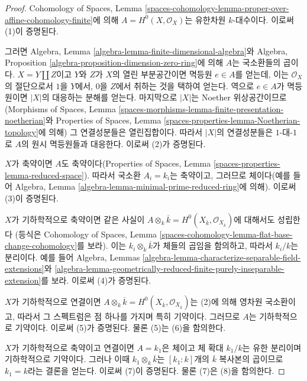 \begin{proof}
Cohomology of Spaces, Lemma
\ref{spaces-cohomology-lemma-proper-over-affine-cohomology-finite}에 의해
$A = H^0(X, \mathcal{O}_X)$는 유한차원 $k$-대수이다. 이로써 (1)이
증명된다.

\medskip\noindent
그러면 Algebra, Lemma \ref{algebra-lemma-finite-dimensional-algebra}와
Algebra, Proposition \ref{algebra-proposition-dimension-zero-ring}에 의해
$A$는 국소환들의 곱이다. $X = Y \amalg Z$이고 $Y$와 $Z$가 $X$의 열린
부분공간이면 멱등원 $e \in A$를 얻는데, 이는 $\mathcal{O}_X$의 절단으로서
$1$을 $Y$에서, $0$을 $Z$에서 취하는 것을 택하여 얻는다. 역으로
$e \in A$가 멱등원이면
$|X|$의 대응하는 분해를 얻는다. 마지막으로 $|X|$는 Noether 위상공간이므로
(Morphisms of Spaces, Lemma
\ref{spaces-morphisms-lemma-finite-presentation-noetherian}와 Properties of
Spaces, Lemma \ref{spaces-properties-lemma-Noetherian-topology}에 의해)
그 연결성분들은 열린집합이다. 따라서 $|X|$의 연결성분들은 $1$-대-$1$로
$A$의 원시 멱등원들과 대응한다. 이로써 (2)가 증명된다.

\medskip\noindent
$X$가 축약이면 $A$도 축약이다(Properties of Spaces, Lemma
\ref{spaces-properties-lemma-reduced-space}). 따라서 국소환
$A_i = k_i$는 축약이고, 그러므로 체이다(예를 들어 Algebra, Lemma
\ref{algebra-lemma-minimal-prime-reduced-ring}에 의해). 이로써 (3)이
증명된다.

\medskip\noindent
$X$가 기하학적으로 축약이면 같은 사실이
$A \otimes_k \overline{k} =
H^0(X_{\overline{k}}, \mathcal{O}_{X_{\overline{k}}})$에 대해서도 성립한다
(등식은 Cohomology of Spaces, Lemma
\ref{spaces-cohomology-lemma-flat-base-change-cohomology}를 보라).
이는 $k_i \otimes_k \overline{k}$가 체들의 곱임을 함의하고, 따라서
$k_i/k$는 분리이다. 예를 들어 Algebra, Lemmas
\ref{algebra-lemma-characterize-separable-field-extensions}와
\ref{algebra-lemma-geometrically-reduced-finite-purely-inseparable-extension}를
보라. 이로써 (4)가 증명된다.

\medskip\noindent
$X$가 기하학적으로 연결이면
$A \otimes_k \overline{k} =
H^0(X_{\overline{k}}, \mathcal{O}_{X_{\overline{k}}})$는 (2)에 의해 영차원
국소환이고, 따라서 그 스펙트럼은 점 하나를 가지며 특히 기약이다. 그러므로
$A$는 기하학적으로 기약이다. 이로써 (5)가 증명된다. 물론 (5)는 (6)을
함의한다.

\medskip\noindent
$X$가 기하학적으로 축약이고 연결이면 $A = k_1$은 체이고 체 확대
$k_1/k$는 유한 분리이며 기하학적으로 기약이다. 그러나 이때
$k_1 \otimes_k \overline{k}$는 $[k_1 : k]$개의 $\overline{k}$ 복사본의
곱이므로 $k_1 = k$라는 결론을 얻는다. 이로써 (7)이
증명된다. 물론 (7)은 (8)을 함의한다.
\end{proof}

